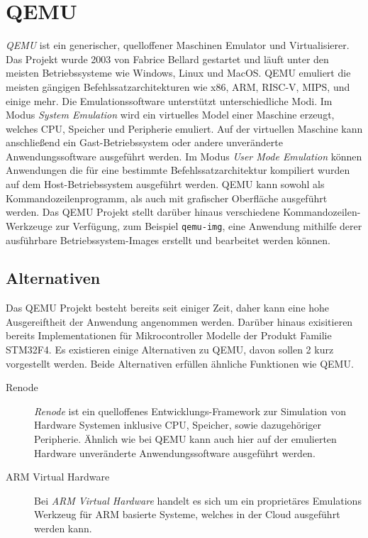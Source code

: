 
\section{QEMU}

\textit{QEMU} ist ein generischer, quelloffener Maschinen Emulator und
Virtualisierer\cite{QemuAbout}.
Das Projekt wurde 2003 von Fabrice Bellard gestartet und läuft unter den
meisten Betriebssysteme wie Windows, Linux und MacOS.
QEMU emuliert die meisten gängigen Befehlssatzarchitekturen wie x86, ARM,
RISC-V, MIPS, und einige mehr\cite{WikiQemu}.
Die Emulationssoftware unterstützt unterschiedliche Modi.
Im Modus \textit{System Emulation} wird ein virtuelles Model einer Maschine
erzeugt, welches CPU, Speicher und Peripherie emuliert.
Auf der virtuellen Maschine kann anschließend ein Gast-Betriebssystem oder
andere unveränderte Anwendungssoftware ausgeführt werden.
\newline
Im Modus \textit{User Mode Emulation} können Anwendungen die für eine bestimmte
Befehlssatzarchitektur kompiliert wurden auf dem Host-Betriebssystem ausgeführt
werden.
\newline
QEMU kann sowohl als Kommandozeilenprogramm, als auch mit grafischer Oberfläche
ausgeführt werden.
Das QEMU Projekt stellt darüber hinaus verschiedene Kommandozeilen-Werkzeuge
zur Verfügung, zum Beispiel \texttt{qemu-img}, eine Anwendung mithilfe derer
ausführbare Betriebssystem-Images erstellt und bearbeitet werden können.

%
\subsection{Alternativen}

Das QEMU Projekt besteht bereits seit einiger Zeit, daher kann eine hohe
Ausgereiftheit der Anwendung angenommen werden.
Darüber hinaus exisitieren bereits Implementationen für Mikrocontroller Modelle
der Produkt Familie STM32F4.
Es existieren einige Alternativen zu QEMU, davon sollen 2 kurz vorgestellt
werden.
Beide Alternativen erfüllen ähnliche Funktionen wie QEMU.
\begin{description}
    \item[Renode]
    \textit{Renode} ist ein quelloffenes Entwicklungs-Framework zur Simulation
    von Hardware Systemen inklusive CPU, Speicher, sowie dazugehöriger
    Peripherie\cite{RenodeAbout}.
    Ähnlich wie bei QEMU kann auch hier auf der emulierten Hardware
    unveränderte Anwendungssoftware ausgeführt werden.
    \item[ARM Virtual Hardware]
    Bei \textit{ARM Virtual Hardware} handelt es sich um ein proprietäres
    Emulations Werkzeug für ARM basierte Systeme, welches in der Cloud
        ausgeführt werden kann\cite{ArmVirtualHwAbout}.
\end{description}

